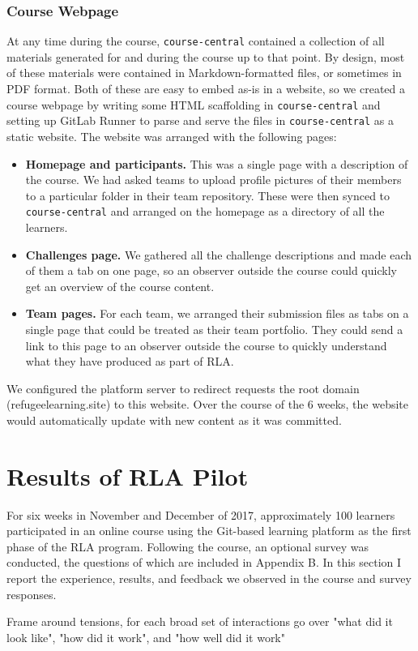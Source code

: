 \documentclass[12pt,twoside]{mitthesis}
\newcommand{\review}[1]{{\color{mygreen} #1}}
\begin{document}
{\subsection{Course Webpage}

At any time during the course, \texttt{course-central} contained a collection of all materials generated for and during the course up to that point. By design, most of these materials were contained in Markdown-formatted files, or sometimes in PDF format. Both of these are easy to embed as-is in a website, so we created a course webpage by writing some HTML scaffolding in \texttt{course-central} and setting up GitLab Runner to parse and serve the files in \texttt{course-central} as a static website. The website was arranged with the following pages:
\begin{itemize}
\item \textbf{Homepage and participants.} This was a single page with a description of the course. We had asked teams to upload profile pictures of their members to a particular folder in their team repository. These were then synced to \texttt{course-central} and arranged on the homepage as a directory of all the learners.
\item \textbf{Challenges page.} We gathered all the challenge descriptions and made each of them a tab on one page, so an observer outside the course could quickly get an overview of the course content.
\item \textbf{Team pages.} For each team, we arranged their submission files as tabs on a single page that could be treated as their team portfolio. They could send a link to this page to an observer outside the course to quickly understand what they have produced as part of RLA.
\end{itemize}
We configured the platform server to redirect requests the root domain (refugeelearning.site) to this website. Over the course of the 6 weeks, the website would automatically update with new content as it was committed.
}

\chapter{Results of RLA Pilot}

\review{For six weeks in November and December of 2017, approximately 100 learners participated in an online course using the Git-based learning platform as the first phase of the RLA program. Following the course, an optional survey was conducted, the questions of which are included in Appendix B. In this section I report the experience, results, and feedback we observed in the course and survey responses.

Frame around tensions, for each broad set of interactions go over "what did it look like", "how did it work", and "how well did it work"}
\end{document}
